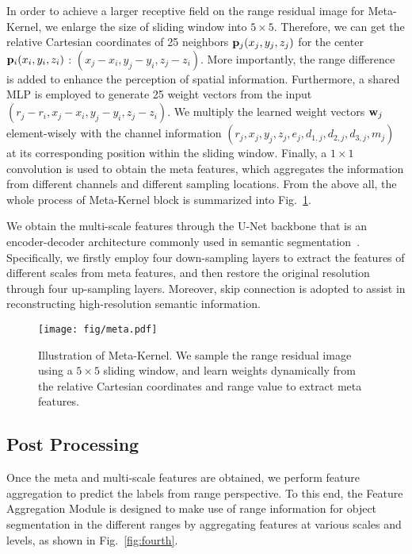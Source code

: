 \documentclass[letterpaper, 10 pt, journal, twoside]{ieeetran}
\begin{document}
In order to achieve a larger receptive field on the range residual image for Meta-Kernel, we enlarge the size of sliding window into $5 \times 5$. Therefore, we can get the relative Cartesian coordinates of 25 neighbors $\bold{p}_{j}(x_j, y_j, z_j)$ for the center $\bold{p}_{i}(x_i, y_i, z_i)$ : $\left(x_{j}-x_{i}, y_{j}-y_{i}, z_{j}-z_{i}\right)$. More importantly, the range difference is added to enhance the perception of spatial information. Furthermore, a shared MLP is employed to generate 25 weight vectors from the input $\left(r_j-r_i, x_{j}-x_{i}, y_{j}-y_{i}, z_{j}-z_{i}\right)$. We multiply the learned weight vectors $\bold{w}_j$ element-wisely with the channel information $(r_j, x_j, y_j, z_j, e_j, d_{1,j}, d_{2,j}, d_{3,j}, m_j)$ at its corresponding position within the sliding window. Finally, a $1 \times 1$ convolution is used to obtain the meta features, which aggregates the information from different channels and different sampling locations. From the above all, the whole process of Meta-Kernel block is summarized into Fig.~\ref{fig:third}.

We obtain the multi-scale features through the U-Net backbone that is an encoder-decoder architecture commonly used in semantic segmentation~\cite{ronneberger2015u,cortinhal2020salsanext}. Specifically, we firstly employ four down-sampling layers to extract the features of different scales from meta features, and then restore the original resolution through four up-sampling layers. Moreover, skip connection is adopted to assist in reconstructing high-resolution semantic information. 


\begin{figure}
 \centering
 \setlength{\abovecaptionskip}{-0.2cm}
\texttt{[image: fig/meta.pdf]}
    \caption{Illustration of Meta-Kernel. We sample the range residual image using a $5 \times 5$ sliding window, and learn weights dynamically from the relative Cartesian coordinates and range value to extract meta features.  }
    \label{fig:third}
    \vspace{-6mm}
\end{figure}

\subsection{Post Processing}
Once the meta and multi-scale features are obtained, we perform feature aggregation to predict the labels from range perspective. To this end, the Feature Aggregation Module is designed to make use of range information for object segmentation in the different ranges by aggregating features at various scales and levels, as shown in Fig.~\ref{fig:fourth}.
\end{document}
